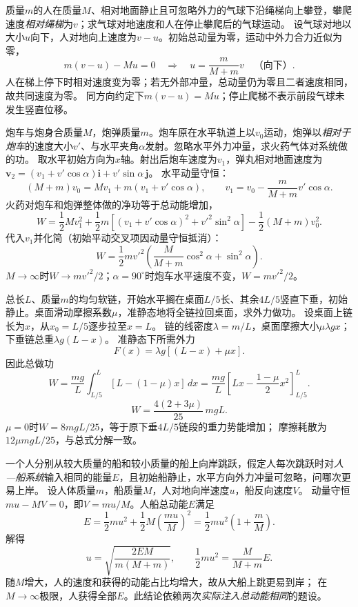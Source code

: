 \problemtext 质量$m$的人在质量$M$、相对地面静止且可忽略外力的气球下沿绳梯向上攀登，攀爬速度\emph{相对绳梯}为$v$；求气球对地速度和人在停止攀爬后的气球运动。
\workings
设气球对地以大小$u$向下，人对地向上速度为$v-u$。初始总动量为零，运动中外力合力近似为零，
\[
m(v-u)-Mu=0
\quad\Longrightarrow\quad
\boxed{u=\frac{m}{M+m}v}\quad\text{（向下）}.
\]
人在梯上停下时相对速度变为零；若无外部冲量，总动量仍为零且二者速度相同，故共同速度为零。
\crosscheck 同方向约定下$m(v-u)=Mu$；停止爬梯不表示前段气球未发生竖直位移。

\problemtext 炮车与炮身合质量$M$，炮弹质量$m$。炮车原在水平轨道上以$v_0$运动，炮弹以\emph{相对于炮车}的速度大小$v'$、与水平夹角$\alpha$发射。忽略水平外力冲量，求火药气体对系统做的功。
\workings
取水平初始方向为$x$轴。射出后炮车速度为$v_1$，弹丸相对地面速度为
$\bm v_2=(v_1+v'\cos\alpha)\bm i+v'\sin\alpha\,\bm j$。
水平动量守恒：
\[
(M+m)v_0=Mv_1+m(v_1+v'\cos\alpha),
\qquad
v_1=v_0-\frac{m}{M+m}v'\cos\alpha.
\]
火药对炮车和炮弹整体做的净功等于总动能增加，
\[
W=\frac12Mv_1^2+\frac12m\left[
 (v_1+v'\cos\alpha)^2+v'^2\sin^2\alpha\right]
 -\frac12(M+m)v_0^2.
\]
代入$v_1$并化简（初始平动交叉项因动量守恒抵消）：
\[
\boxed{W=\frac12mv'^2\left(
\frac{M}{M+m}\cos^2\alpha+\sin^2\alpha\right)}.
\]
\crosscheck $M\to\infty$时$W\to mv'^2/2$；$\alpha=90^\circ$时炮车水平速度不变，$W=mv'^2/2$。

\problemtext 总长$L$、质量$m$的均匀软链，开始水平搁在桌面$L/5$长、其余$4L/5$竖直下垂，初始静止。桌面滑动摩擦系数$\mu$，准静态地将全链拉回桌面，求外力做功。
\workings
设桌面上链长为$x$，从$x_0=L/5$逐步拉至$x=L$。
链的线密度$\lambda=m/L$，桌面摩擦大小$\mu\lambda gx$；下垂链总重$\lambda g(L-x)$。
准静态下所需外力
\[
F(x)=\lambda g[(L-x)+\mu x].
\]
因此总做功
\[
W=\frac{mg}{L}\int_{L/5}^{L}
 [L-(1-\mu)x]\,dx
=\frac{mg}{L}\left[
Lx-\frac{1-\mu}{2}x^2\right]_{L/5}^L.
\]
\[
\boxed{W=\frac{4(2+3\mu)}{25}\,mgL}.
\]
\crosscheck $\mu=0$时$W=8mgL/25$，等于原下垂$4L/5$链段的重力势能增加；
摩擦耗散为$12\mu mgL/25$，与总式分解一致。

\problemtext 一个人分别从较大质量的船和较小质量的船上向岸跳跃，假定人每次跳跃时对\emph{人—船系统}输入相同的能量$E$，且初始船静止，水平方向外力冲量可忽略，问哪次更易上岸。
\workings
设人体质量$m$，船质量$M$，人对地向岸速度$u$，船反向速度$V$。
动量守恒$mu-MV=0$，即$V=mu/M$。人船总动能$E$满足
\[
E=\frac12mu^2+\frac12M\left(\frac{mu}{M}\right)^2
=\frac12mu^2\left(1+\frac mM\right).
\]
解得
\[
\boxed{u=\sqrt{\frac{2EM}{m(M+m)}}},\qquad
\frac12mu^2=\frac{M}{M+m}E.
\]
\crosscheck 随$M$增大，人的速度和获得的动能占比均增大，故从大船上跳更易到岸；
在$M\to\infty$极限，人获得全部$E$。此结论依赖两次\emph{实际注入总动能相同}的题设。
